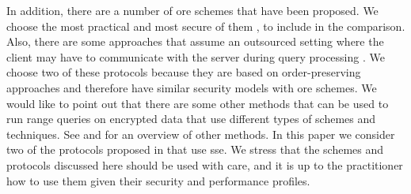 		In addition, there are a number of \acrshort{ore} schemes \cite{ore-original, clww-ore, lewi-wu-ore, parameter-hiding-ore, parameter-hiding-ore, ore-learning, ore-partial, ore-multi-client} that have been proposed. %
		We choose the most practical and most secure of them \cite{clww-ore, lewi-wu-ore, parameter-hiding-ore}, to include in the comparison. %
		Also, there are some approaches that assume an outsourced setting where the client may have to communicate with the server during query processing \cite{pope, florian-protocol, secure-queries-overview, practical-range-search}.
		We choose two of these protocols \cite{pope, florian-protocol} because they are based on order-preserving approaches and therefore have similar security models with \acrshort{ore} schemes.
		We would like to point out that there are some other methods that can be used to run range queries on encrypted data that use different types of schemes and techniques.
		See \cite{secure-queries-overview} and \cite{protocols-survey} for an overview of other methods. %
		In this paper we consider two of the protocols proposed in \cite{practical-range-search} that use \acrfull{sse}.
		We stress that the schemes and protocols discussed here should be used with care, and it is up to the practitioner how to use them given their security and performance profiles.

